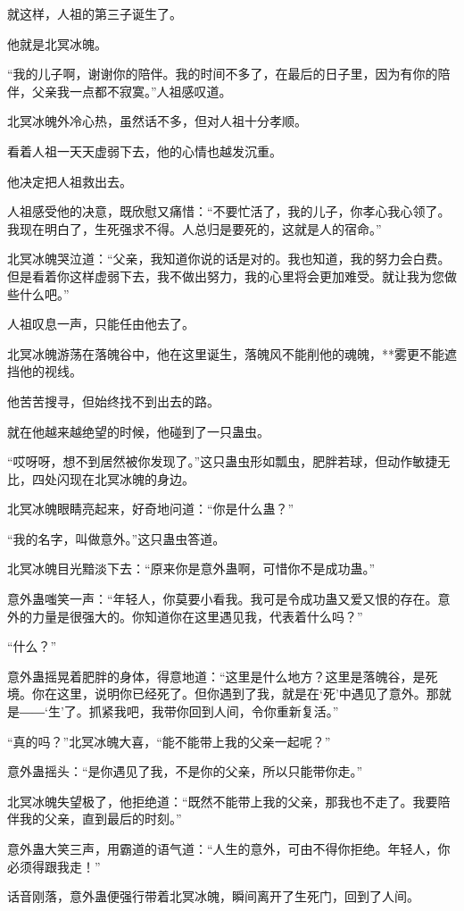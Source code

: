 \begin{this_body}
就这样，人祖的第三子诞生了。

他就是北冥冰魄。

“我的儿子啊，谢谢你的陪伴。我的时间不多了，在最后的日子里，因为有你的陪伴，父亲我一点都不寂寞。”人祖感叹道。

北冥冰魄外冷心热，虽然话不多，但对人祖十分孝顺。

看着人祖一天天虚弱下去，他的心情也越发沉重。

他决定把人祖救出去。

人祖感受他的决意，既欣慰又痛惜：“不要忙活了，我的儿子，你孝心我心领了。我现在明白了，生死强求不得。人总归是要死的，这就是人的宿命。”

北冥冰魄哭泣道：“父亲，我知道你说的话是对的。我也知道，我的努力会白费。但是看着你这样虚弱下去，我不做出努力，我的心里将会更加难受。就让我为您做些什么吧。”

人祖叹息一声，只能任由他去了。

北冥冰魄游荡在落魄谷中，他在这里诞生，落魄风不能削他的魂魄，**雾更不能遮挡他的视线。

他苦苦搜寻，但始终找不到出去的路。

就在他越来越绝望的时候，他碰到了一只蛊虫。

“哎呀呀，想不到居然被你发现了。”这只蛊虫形如瓢虫，肥胖若球，但动作敏捷无比，四处闪现在北冥冰魄的身边。

北冥冰魄眼睛亮起来，好奇地问道：“你是什么蛊？”

“我的名字，叫做意外。”这只蛊虫答道。

北冥冰魄目光黯淡下去：“原来你是意外蛊啊，可惜你不是成功蛊。”

意外蛊嗤笑一声：“年轻人，你莫要小看我。我可是令成功蛊又爱又恨的存在。意外的力量是很强大的。你知道你在这里遇见我，代表着什么吗？”

“什么？”

意外蛊摇晃着肥胖的身体，得意地道：“这里是什么地方？这里是落魄谷，是死境。你在这里，说明你已经死了。但你遇到了我，就是在‘死’中遇见了意外。那就是――‘生’了。抓紧我吧，我带你回到人间，令你重新复活。”

“真的吗？”北冥冰魄大喜，“能不能带上我的父亲一起呢？”

意外蛊摇头：“是你遇见了我，不是你的父亲，所以只能带你走。”

北冥冰魄失望极了，他拒绝道：“既然不能带上我的父亲，那我也不走了。我要陪伴我的父亲，直到最后的时刻。”

意外蛊大笑三声，用霸道的语气道：“人生的意外，可由不得你拒绝。年轻人，你必须得跟我走！”

话音刚落，意外蛊便强行带着北冥冰魄，瞬间离开了生死门，回到了人间。


\end{this_body}
